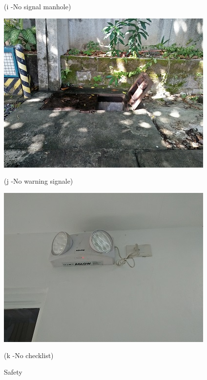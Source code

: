 \begin{figure}
\begin{minipage}[b]{0.22\linewidth}
	\caption*{(i -No signal manhole)}
\end{minipage}
	\hspace{0.05cm}
\begin{minipage}[b]{0.22\linewidth}
	\centering
	\includegraphics[width=\textwidth]{figures/R1P_safety/manhole_no_warning.jpg}
	\caption*{(j -No warning signale)}
\end{minipage}
	\hspace{0.05cm}
\begin{minipage}[b]{0.22\linewidth}
	\centering
	\includegraphics[width=\textwidth]{figures/R1P_safety/nochecklist_emergengylight.jpg}
	\caption*{(k -No checklist)}
\end{minipage}
	\caption{Safety}
	\label{ch04_fig_fdas_safety}
\end{figure}